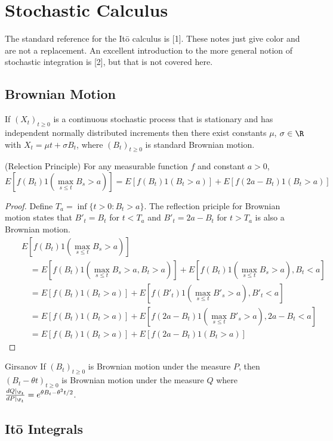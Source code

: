 \section{Stochastic Calculus}
The standard reference for the It\=o calculus is [1].
These notes just give color and are not a replacement.
An excellent introduction to the more general notion of
stochastic integration is [2], but that is not
covered here.

\subsection{Brownian Motion}
If $(X_t)_{t\ge0}$ is a continuous stochastic process that is stationary
and has independent normally distributed increments then there exist
constants $\mu$, $\sigma\in\R$ with $X_t = \mu t + \sigma B_t$, where
$(B_t)_{t\ge0}$ is standard Brownian motion.

\begin{theorem}{(Relection Principle)}
For any measurable function $f$ and constant $a > 0$,
$$
E[f(B_t)1(\max_{s\le t} B_s > a)]
= E[f(B_t)1(B_t > a)]
+ E[f(2a - B_t)1(B_t > a)]
$$
\end{theorem}
\begin{proof}
Define $T_a = \inf\{t > 0 : B_t > a\}$. The reflection priciple
for Brownian motion states that
$B'_t = B_t$ for $t < T_a$ and $B'_t = 2a - B_t$ for $t > T_a$
is also a Brownian motion.
\begin{eqnarray*}
&&E[f(B_t)1(\max_{s\le t} B_s > a)]\\
&&\quad= E[f(B_t)1(\max_{s\le t} B_s > a, B_t > a)]
+ E[f(B_t)1(\max_{s\le t} B_s > a), B_t < a]\\
&&\quad= E[f(B_t)1(B_t > a)]
+ E[f(B'_t)1(\max_{s\le t} B'_s > a), B'_t < a]\\
&&\quad= E[f(B_t)1(B_t > a)]
+ E[f(2a - B_t)1(\max_{s\le t} B'_s > a), 2a - B_t < a]\\
&&\quad= E[f(B_t)1(B_t > a)]
+ E[f(2a - B_t)1(B_t > a)]
\end{eqnarray*}
\end{proof}
\begin{theorem}{Girsanov}
If $(B_t)_{t\ge0}$ is Brownian motion under the measure $P$, then
$(B_t - \theta t)_{t\ge0}$ is Brownian motion under the measure
$Q$ where $\frac{dQ|_{\F_t}}{dP|_{\F_t}} = e^{\theta B_t - \theta^2 t/2}$.
\end{theorem}

\subsection{It\=o Integrals}

